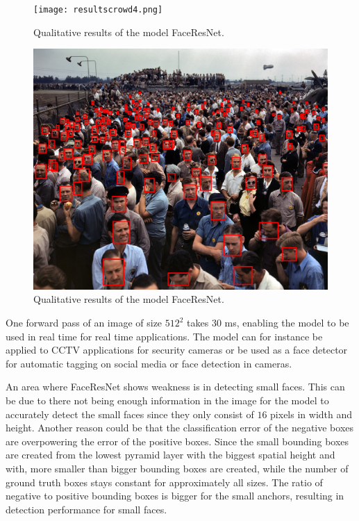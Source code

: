 \documentclass[a4paper, twoside]{article}
\begin{document}
\begin{figure}[h]
  		\texttt{[image: resultscrowd4.png]}
  		\caption{Qualitative results of the model FaceResNet.}\label{resultscrowd4}
\end{figure}
\begin{figure}[h]
  		\includegraphics[scale=0.32]{resultscrowd.png}
  		\caption{Qualitative results of the model FaceResNet.}\label{resultscrowd}
\end{figure}



One forward pass of an image of size $512^2$ takes 30 ms, enabling the model to be used in real time for real time applications. The model can for instance be applied to CCTV applications for security cameras or be used as a face detector for automatic tagging on social media or face detection in cameras.

An area where FaceResNet shows weakness is in detecting small faces. This can be due to there not being enough information in the image for the model to accurately detect the small faces since they only consist of $16$ pixels in width and height. Another reason could be that the classification error of the negative boxes are overpowering the error of the positive boxes. Since the small bounding boxes are created from the lowest pyramid layer with the biggest spatial height and with, more smaller than bigger bounding boxes are created, while the number of ground truth boxes stays constant for approximately all sizes. The ratio of negative to positive bounding boxes is bigger for the small anchors, resulting in detection performance for small faces.
\end{document}

